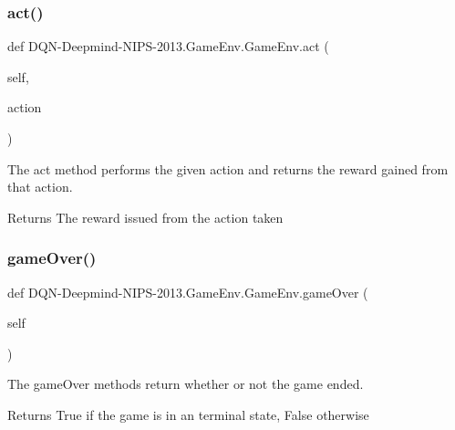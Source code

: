 \subsubsection{\texorpdfstring{act()}{act()}}
{\footnotesize\ttfamily def D\+QN-\/Deepmind-\/N\+I\+PS-\/2013.Game\+Env.\+Game\+Env.\+act (\begin{DoxyParamCaption}\item[{}]{self,  }\item[{}]{action }\end{DoxyParamCaption})}



The act method performs the given action and returns the reward gained from that action. 

\begin{DoxyReturn}{Returns}
The reward issued from the action taken 
\end{DoxyReturn}
\hypertarget{classDQN-Deepmind-NIPS-2013_1_1GameEnv_1_1GameEnv_a1ccc35e029e05910c3c25ffa602e442b}{}\label{classDQN-Deepmind-NIPS-2013_1_1GameEnv_1_1GameEnv_a1ccc35e029e05910c3c25ffa602e442b} 
\subsubsection{\texorpdfstring{game\+Over()}{gameOver()}}
{\footnotesize\ttfamily def D\+QN-\/Deepmind-\/N\+I\+PS-\/2013.Game\+Env.\+Game\+Env.\+game\+Over (\begin{DoxyParamCaption}\item[{}]{self }\end{DoxyParamCaption})}



The game\+Over methods return whether or not the game ended. 

\begin{DoxyReturn}{Returns}
True if the game is in an terminal state, False otherwise 
\end{DoxyReturn}
\hypertarget{classDQN-Deepmind-NIPS-2013_1_1GameEnv_1_1GameEnv_a37712548267b91afddb6866fddf22b94}{}\label{classDQN-Deepmind-NIPS-2013_1_1GameEnv_1_1GameEnv_a37712548267b91afddb6866fddf22b94} 
